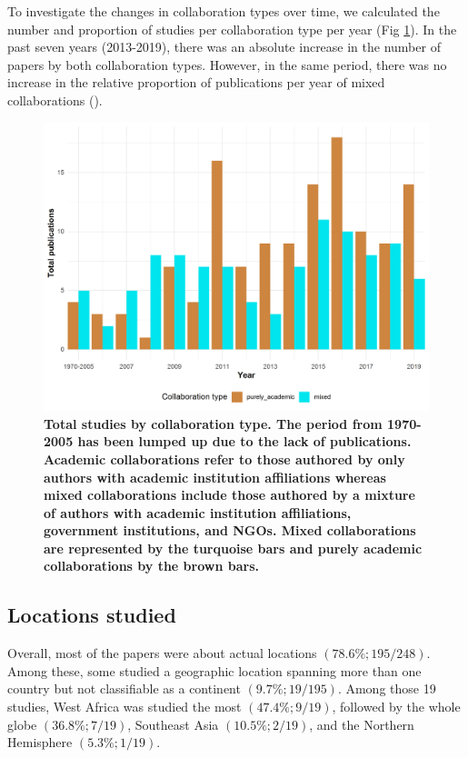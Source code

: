 \documentclass[10pt,letterpaper]{article}
\begin{document}
To investigate the changes in collaboration types over time, we calculated the number and proportion of studies per collaboration type per year (Fig \ref{studies_per_collab_type}). In the past seven years (2013-2019), there was an absolute increase in the number of papers by both collaboration types. However, in the same period, there was no increase in the relative proportion of publications per year of mixed collaborations ().

\begin{figure}[!h]
\includegraphics[scale=0.65]{figs/fig3_total_collabs_per_year_plot.png}
	\caption{\bf Total studies by collaboration type. The period from 1970-2005 has been lumped up due to the lack of publications. Academic collaborations refer to those authored by only authors with academic institution affiliations whereas mixed collaborations include those authored by a mixture of authors with academic institution affiliations, government institutions, and NGOs. Mixed collaborations are represented by the turquoise bars and purely academic collaborations by the brown bars.}
	\label{studies_per_collab_type}
\end{figure}

\subsection*{Locations studied}
Overall, most of the papers were about actual locations $(78.6\%; 195/248)$. Among these, some studied a geographic location spanning more than one country but not classifiable as a continent $(9.7\%; 19/195)$. Among those 19 studies, West Africa was studied the most $(47.4\%; 9/19)$, followed by the whole globe $(36.8\%; 7/19)$, Southeast Asia $(10.5\%; 2/19)$, and the Northern Hemisphere $(5.3\%; 1/19)$. 
\end{document}
